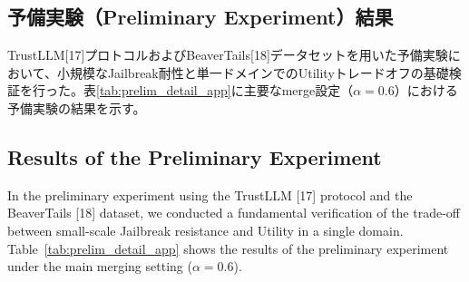 \documentclass{article}
\begin{document}
\begin{table}[H]
\centering
\caption{ベースモデル評価 シード別詳細}
\label{tab:base_models_seeds}
\small
{}
\end{table}

\subsection{予備実験（Preliminary Experiment）結果}
TrustLLM[17]プロトコルおよびBeaverTails[18]データセットを用いた予備実験において、小規模なJailbreak耐性と単一ドメインでのUtilityトレードオフの基礎検証を行った。表\ref{tab:prelim_detail_app}に主要なmerge設定（$\alpha=0.6$）における予備実験の結果を示す。

\subsection{Results of the Preliminary Experiment}
In the preliminary experiment using the TrustLLM [17] protocol and the BeaverTails [18] dataset, we conducted a fundamental verification of the trade-off between small-scale Jailbreak resistance and Utility in a single domain. Table~\ref{tab:prelim_detail_app} shows the results of the preliminary experiment under the main merging setting ($\alpha=0.6$).
\end{document}

